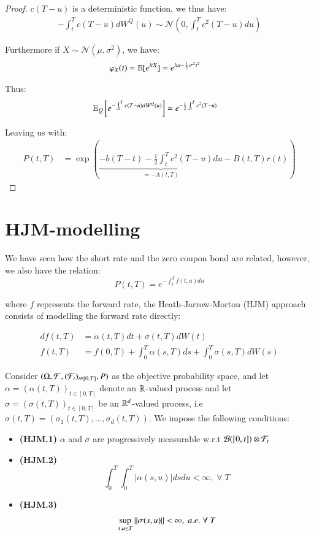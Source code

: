 \begin{proof}
$c(T-u)$ is a deterministic function, we thus have: 
\begin{align*}
 -\int_{t}^{T}c(T-u)dW^{Q}(u) \sim 
 \mathcal{N}\left(
 0, \int_{t}^{T}c^{2}(T-u)du
 \right)
\end{align*}

Furthermore if $X\sim \mathcal{N}(\mu, \sigma^{2})$, we have: 
\begin{align*}
\varphi_{X}(t) &= \mathbb{E}[e^{itX}] = e^{iut - \frac{1}{2}\sigma^{2}t^{2}}    
\end{align*}

Thus: 
\begin{align*}
\mathbb{E}_{Q}\left[
e^{
-\int_{t}^{T}c(T-u)dW^{Q}(u)
}
\right]
&= 
e^{-\frac{1}{2}\int_{t}^{T}c^{2}(T-u)}
\end{align*}

Leaving us with: 
\begin{align*}
P(t,T) 
&= 
\exp\left(
\underbrace{
-b(T-t) -\frac{1}{2}\int_{t}^{T}c^{2}(T-u)du
}_{= -A(t,T)}
-B(t,T)r(t)
\right)
\end{align*}


\end{proof}




\section{HJM-modelling} 
We have seen how the short rate and the zero coupon bond are related, however, we also have the relation: 
\[
P(t,T) = e^{-\int_{t}^{T}f(t,u)du}
\]

where $f$ represents the forward rate, the Heath-Jarrow-Morton (HJM) 
approach consists of modelling the forward rate directly:

\begin{align*}
df(t,T) &= \alpha(t,T)dt + \sigma(t,T)dW(t) \\ 
f(t,T) &= f(0,T) + \int_{0}^{T}\alpha(s,T)ds + \int_{0}^{T}\sigma(s,T)dW(s)
\end{align*}

Consider $(\Omega, \mathcal{F}, (\mathcal{F}_{t})_{t \in [0,T]}, P)$ as the objective probability space, and let $\alpha = (\alpha(t,T))_{t \in [0,T]}$ denote an $\mathbb{R}$-valued process and let $\sigma = (\sigma(t,T))_{t \in [0,T]}$ be an $\mathbb{R}^{d}$-valued process, i.e $\sigma(t,T) = (\sigma_{1}(t,T), \dots, \sigma_{d}(t,T))$. We impose the following conditions: 
\begin{itemize}
    \item \textbf{(HJM.1)} $\alpha$ and $\sigma$ are progressively measurable w.r.t $\mathcal{B}([0,t])\otimes \mathcal{F}_{t}$
    \item \textbf{(HJM.2)}\[
    \int_{0}^{T}\int_{0}^{T}|\alpha(s,u)|dsdu < \infty,\; \forall\; T
    \]
    \item \textbf{(HJM.3)} \[
    \sup\limits_{s,u \leq T}\norm{\sigma(s,u)} < \infty,\; a.e. \;\forall\;T
    \]
\end{itemize} 

